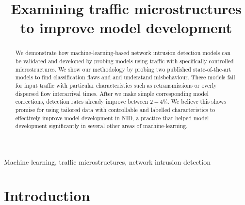 \documentclass[conference]{IEEEtran}
\begin{document}
 

\title{Examining traffic microstructures to improve model development}

\author{
\and
{}
}

\maketitle

\begin{abstract}

We demonstrate how machine-learning-based network intrusion detection models can be validated and developed by probing models using traffic with specifically controlled microstructures. We show our methodology by probing two published state-of-the-art models to find classification flaws and and understand misbehaviour. These models fail for input traffic with particular characteristics such as retransmissions or overly dispersed flow interarrival times. After we make simple corresponding model corrections, detection rates already improve between $2-4\%$.
We believe this shows promise for using tailored data with controllable and labelled characteristics to effectively improve model development in NID, a practice that helped model development significantly in several other areas of machine-learning.

\end{abstract}


\begin{IEEEkeywords}
Machine learning, traffic microstructures, network intrusion detection
\end{IEEEkeywords} 	



\section{Introduction}
\end{document}
